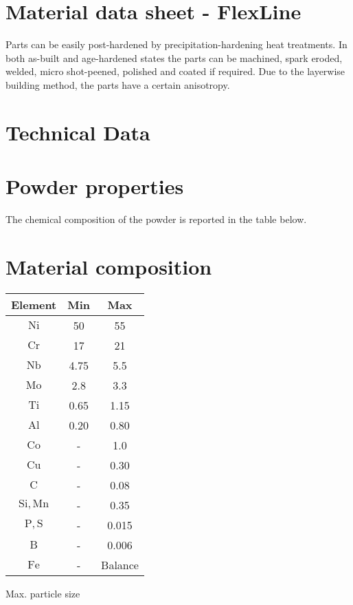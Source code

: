 \documentclass[10pt]{article}
\begin{document}
\section*{Material data sheet - FlexLine}
Parts can be easily post-hardened by precipitation-hardening heat treatments. In both as-built and age-hardened states the parts can be machined, spark eroded, welded, micro shot-peened, polished and coated if required. Due to the layerwise building method, the parts have a certain anisotropy.

\section*{Technical Data}
\section*{Powder properties}
The chemical composition of the powder is reported in the table below.

\section*{Material composition}
\begin{center}
\begin{tabular}{ccc}
Element & Min & Max \\
\hline
$\mathrm{Ni}$ & 50 & 55 \\
\hline
$\mathrm{Cr}$ & 17 & 21 \\
\hline
$\mathrm{Nb}$ & 4.75 & 5.5 \\
\hline
$\mathrm{Mo}$ & 2.8 & 3.3 \\
\hline
$\mathrm{Ti}$ & 0.65 & 1.15 \\
\hline
$\mathrm{Al}$ & 0.20 & 0.80 \\
\hline
$\mathrm{Co}$ & - & 1.0 \\
\hline
$\mathrm{Cu}$ & - & 0.30 \\
\hline
$\mathrm{C}$ & - & 0.08 \\
\hline
$\mathrm{Si}, \mathrm{Mn}$ & - & 0.35 \\
\hline
$\mathrm{P}, \mathrm{S}$ & - & 0.015 \\
\hline
$\mathrm{B}$ & - & 0.006 \\
\hline
$\mathrm{Fe}$ & - & Balance \\
\hline
\end{tabular}
\end{center}

Max. particle size
\end{document}
